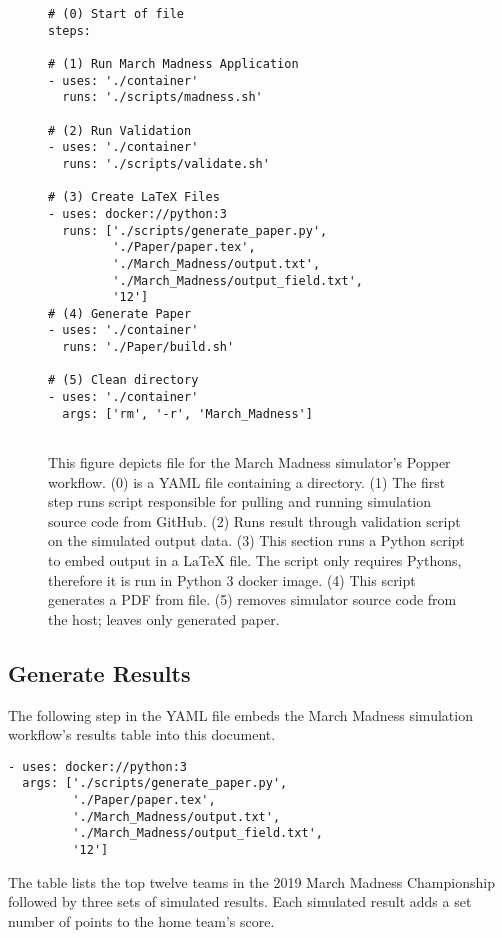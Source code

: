\documentclass{IEEEtran}
\begin{document}
\begin{figure}[h]
\centering
\begin{mdframed}
\small
\begin{verbatim}
# (0) Start of file
steps:

# (1) Run March Madness Application
- uses: './container'
  runs: './scripts/madness.sh'

# (2) Run Validation
- uses: './container'
  runs: './scripts/validate.sh'

# (3) Create LaTeX Files
- uses: docker://python:3
  runs: ['./scripts/generate_paper.py', 
         './Paper/paper.tex',
         './March_Madness/output.txt',
         './March_Madness/output_field.txt', 
         '12']
# (4) Generate Paper
- uses: './container'
  runs: './Paper/build.sh'

# (5) Clean directory
- uses: './container'
  args: ['rm', '-r', 'March_Madness']
  
\end{verbatim}
\end{mdframed}
\caption{\footnotesize This figure depicts  file for the March Madness simulator's Popper workflow. (0)  is a YAML file containing a  directory. (1) The first step runs  script responsible for pulling and running simulation source code from GitHub. (2) Runs result through validation script on the simulated output data. (3) This section runs a Python script to embed output in a LaTeX file. The script only requires Pythons, therefore it is run in Python 3 docker image. (4) This script generates a PDF from  file. (5) removes simulator source code from the host; leaves only generated paper. }

\label{wf.yml}
\end{figure}

\subsection{Generate Results}
The following step in the YAML file embeds the March Madness simulation workflow's results table into this document. 
 

\begin{lstlisting}[style=DOS]
- uses: docker://python:3
  args: ['./scripts/generate_paper.py', 
         './Paper/paper.tex',
         './March_Madness/output.txt',
         './March_Madness/output_field.txt', 
         '12']
\end{lstlisting}         
The table lists the top twelve teams in the 2019 March Madness Championship followed by three sets of simulated results. Each simulated result adds a set number of points to the home team's score.          
\\
\end{document}
